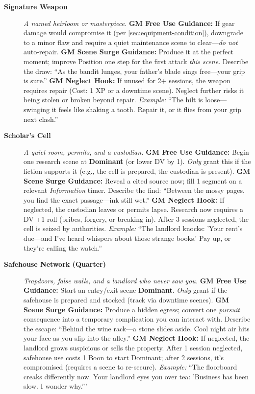 \begin{description}
  \item[\textbf{Signature Weapon}]   
        \emph{A named heirloom or masterpiece.}  
        \textbf{GM Free Use Guidance:} If gear damage would compromise it (per \ref{sec:equipment-condition}), downgrade to a minor flaw and require a quiet maintenance scene to clear---\emph{do not} auto-repair.  
        \textbf{GM Scene Surge Guidance:} Produce it at the perfect moment; improve Position one step for the first attack \emph{this scene}. Describe the draw: ``As the bandit lunges, your father's blade sings free---your grip is sure.''  
        \textbf{GM Neglect Hook:} If unused for 2+ sessions, the weapon requires repair (Cost: 1 XP or a downtime scene). Neglect further risks it being stolen or broken beyond repair.  
        \textit{Example:} ``The hilt is loose---swinging it feels like shaking a tooth. Repair it, or it flies from your grip next clash.''  

  \item[\textbf{Scholar's Cell}]   
        \emph{A quiet room, permits, and a custodian.}  
        \textbf{GM Free Use Guidance:} Begin one research scene at \textbf{Dominant} (or lower DV by 1). \emph{Only} grant this if the fiction supports it (e.g., the cell is prepared, the custodian is present).  
        \textbf{GM Scene Surge Guidance:} Reveal a cited source now; fill 1 segment on a relevant \emph{Information} timer. Describe the find: ``Between the mossy pages, you find the exact passage---ink still wet.''  
        \textbf{GM Neglect Hook:} If neglected, the custodian leaves or permits lapse. Research now requires a DV +1 roll (bribes, forgery, or breaking in). After 3 sessions neglected, the cell is seized by authorities.  
        \textit{Example:} ``The landlord knocks: 'Your rent's due---and I've heard whispers about those strange books.' Pay up, or they're calling the watch.''  

  \item[\textbf{Safehouse Network (Quarter)}]   
        \emph{Trapdoors, false walls, and a landlord who never saw you.}  
        \textbf{GM Free Use Guidance:} Start an entry/exit scene \textbf{Dominant}. \emph{Only} grant if the safehouse is prepared and stocked (track via downtime scenes).  
        \textbf{GM Scene Surge Guidance:} Produce a hidden egress; convert one \emph{pursuit} consequence into a temporary complication you can interact with. Describe the escape: ``Behind the wine rack---a stone slides aside. Cool night air hits your face as you slip into the alley.''  
        \textbf{GM Neglect Hook:} If neglected, the landlord grows suspicious or sells the property. After 1 session neglected, safehouse use costs 1 Boon to start Dominant; after 2 sessions, it's compromised (requires a scene to re-secure).  
        \textit{Example:} ``The floorboard creaks differently now. Your landlord eyes you over tea: 'Business has been slow. I wonder why.'''  


\end{description}
